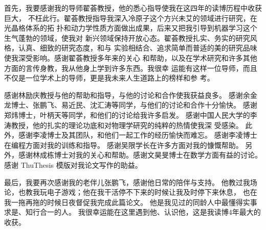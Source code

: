 \begin{acknowledgement}

首先，我要感谢我的导师翟荟教授，他的悉心指导使我在这四年的读博历程中收获巨大，
不枉此行。翟荟教授指导我深入冷原子这个方兴未艾的领域进行研究，在光晶格体系的拓
扑和动力学性质方面做出成果，后来又把我引导到机器学习这个生气蓬勃的领域，使我对
新兴领域保持开放心态。翟荟教授扎实、务实的研究风格，认真、细致的研究态度，和与
实验相结合、追求简单而普适的美的研究品味使我深受影响。感谢翟荟教授多年来的关心
和帮助，以及在学术研究和许多其他方面的言传身教，我从他身上学到许多东西。我很幸
运能有这样一位导师，而且不仅是一位学术上的导师，更是我未来人生道路上的榜样和参
考。

感谢林励庆教授与他的帮助和指导，与他的讨论和合作使我获益良多。
感谢余金龙博士、张鹏飞、易近民、沈汇涛等同学，与他们的讨论和合作十分愉快。
感谢郑炜博士，叶柄天等同学，和他们的讨论给我许多启发。
感谢中国人民大学的李涛教授，他的扎实的理论功底和对物理学研究的纯粹的热情使我深
受感染。
此外，感谢李凌博士及其团队，和他们一起工作的经历愉快而难忘。
感谢李凌博士在编程方面对我的训练和指导。
感谢吴限学长在许多方面对我的慷慨帮助。
另外，感谢林成栋博士对我的关心和帮助。感谢文昊旻博士在数学方面有益的讨论。
感谢 ThuThesis 模版对我论文写作的助益。

最后，我要再次感谢我的老伴儿张鹏飞，感谢他日常的陪伴与支持。
他教过我场论，也教我玩电子游戏；他在我干活停不下来的时候让我及时停下来休息，
也在我一拖再拖的时候日夜督促我完成此篇论文。
他是我见过的同龄人中最懂得实事求是、知行合一的人。
我很幸运能在这里遇到他、认识他，这是我读博4年最大的收获。

\end{acknowledgement}
